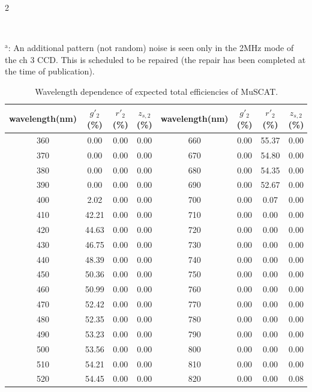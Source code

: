 \documentclass[a4paper,12pt]{spieman}  %
\begin{document}
\begin{spacing}{2}
\begin{table}
\begin{center}
\begin{tabular}{clll}
\hline
\end{tabular}
\\
{\scriptsize
$^\mathrm{a}$: An additional pattern (not random) noise is seen only in the 2MHz mode of the ch 3 CCD.
This is scheduled to be repaired (the repair has been completed at the time of publication).
}
\end{center}
\end{table}

\begin{table}
\caption{
\label{totalefficiencytable}
Wavelength dependence of expected total efficiencies of MuSCAT.
}
\begin{center}
\begin{tabular}{cccccccc}
\hline
wavelength(nm) & $g'_2$(\%) & $r'_2$(\%)  & $z_{s,2}$(\%)  & wavelength(nm) & $g'_2$(\%) & $r'_2$(\%)  & $z_{s,2}$(\%) \\
\hline
360	&	0.00 	&	0.00 	&	0.00 	&	660	&	0.00 	&	55.37 	&	0.00 	\\
370	&	0.00 	&	0.00 	&	0.00 	&	670	&	0.00 	&	54.80 	&	0.00 	\\
380	&	0.00 	&	0.00 	&	0.00 	&	680	&	0.00 	&	54.35 	&	0.00 	\\
390	&	0.00 	&	0.00 	&	0.00 	&	690	&	0.00 	&	52.67 	&	0.00 	\\
400	&	2.02 	&	0.00 	&	0.00 	&	700	&	0.00 	&	0.07 	&	0.00 	\\
410	&	42.21 	&	0.00 	&	0.00 	&	710	&	0.00 	&	0.00 	&	0.00 	\\
420	&	44.63 	&	0.00 	&	0.00 	&	720	&	0.00 	&	0.00 	&	0.00 	\\
430	&	46.75 	&	0.00 	&	0.00 	&	730	&	0.00 	&	0.00 	&	0.00 	\\
440	&	48.39 	&	0.00 	&	0.00 	&	740	&	0.00 	&	0.00 	&	0.00 	\\
450	&	50.36 	&	0.00 	&	0.00 	&	750	&	0.00 	&	0.00 	&	0.00 	\\
460	&	50.99 	&	0.00 	&	0.00 	&	760	&	0.00 	&	0.00 	&	0.00 	\\
470	&	52.42 	&	0.00 	&	0.00 	&	770	&	0.00 	&	0.00 	&	0.00 	\\
480	&	52.35 	&	0.00 	&	0.00 	&	780	&	0.00 	&	0.00 	&	0.00 	\\
490	&	53.23 	&	0.00 	&	0.00 	&	790	&	0.00 	&	0.00 	&	0.00 	\\
500	&	53.56 	&	0.00 	&	0.00 	&	800	&	0.00 	&	0.00 	&	0.00 	\\
510	&	54.21 	&	0.00 	&	0.00 	&	810	&	0.00 	&	0.00 	&	0.00 	\\
520	&	54.45 	&	0.00 	&	0.00 	&	820	&	0.00 	&	0.00 	&	0.08 	\\

\end{tabular}
\end{center}
\end{table}
\end{spacing}
\end{document}
